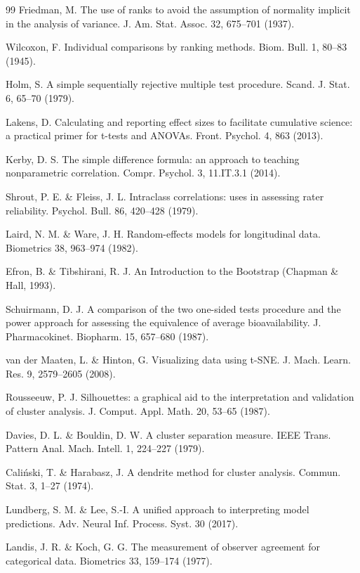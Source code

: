 \begin{thebibliography}{99}
 Friedman, M. The use of ranks to avoid the assumption of normality implicit in the analysis of variance. J. Am. Stat. Assoc. 32, 675–701 (1937).

 Wilcoxon, F. Individual comparisons by ranking methods. Biom. Bull. 1, 80–83 (1945).

 Holm, S. A simple sequentially rejective multiple test procedure. Scand. J. Stat. 6, 65–70 (1979).

 Lakens, D. Calculating and reporting effect sizes to facilitate cumulative science: a practical primer for t-tests and ANOVAs. Front. Psychol. 4, 863 (2013).

 Kerby, D. S. The simple difference formula: an approach to teaching nonparametric correlation. Compr. Psychol. 3, 11.IT.3.1 (2014).

 Shrout, P. E. \& Fleiss, J. L. Intraclass correlations: uses in assessing rater reliability. Psychol. Bull. 86, 420–428 (1979).

 Laird, N. M. \& Ware, J. H. Random-effects models for longitudinal data. Biometrics 38, 963–974 (1982).

 Efron, B. \& Tibshirani, R. J. An Introduction to the Bootstrap (Chapman \& Hall, 1993).

 Schuirmann, D. J. A comparison of the two one-sided tests procedure and the power approach for assessing the equivalence of average bioavailability. J. Pharmacokinet. Biopharm. 15, 657–680 (1987).

 van der Maaten, L. \& Hinton, G. Visualizing data using t-SNE. J. Mach. Learn. Res. 9, 2579–2605 (2008).

 Rousseeuw, P. J. Silhouettes: a graphical aid to the interpretation and validation of cluster analysis. J. Comput. Appl. Math. 20, 53–65 (1987).

 Davies, D. L. \& Bouldin, D. W. A cluster separation measure. IEEE Trans. Pattern Anal. Mach. Intell. 1, 224–227 (1979).

 Caliński, T. \& Harabasz, J. A dendrite method for cluster analysis. Commun. Stat. 3, 1–27 (1974).

 Lundberg, S. M. \& Lee, S.-I. A unified approach to interpreting model predictions. Adv. Neural Inf. Process. Syst. 30 (2017).

 Landis, J. R. \& Koch, G. G. The measurement of observer agreement for categorical data. Biometrics 33, 159–174 (1977).
\end{thebibliography}


